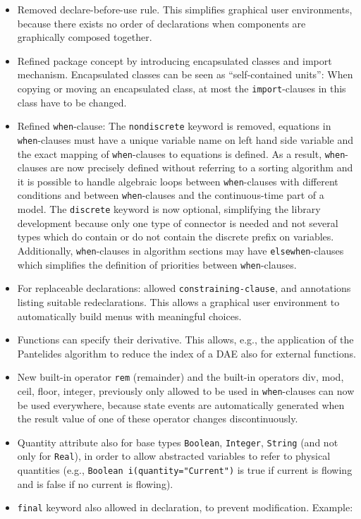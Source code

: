 \begin{itemize}
\item
  Removed declare-before-use rule. This simplifies graphical user
  environments, because there exists no order of declarations when
  components are graphically composed together.
\item
  Refined package concept by introducing encapsulated classes and import mechanism.
  Encapsulated classes can be seen as ``self-contained units'':
  When copying or moving an encapsulated class, at most the \lstinline!import!-clauses in this class have to be changed.
\item
  Refined \lstinline!when!-clause:
  The \lstinline[morekeywords={[2]{nondiscrete}}]!nondiscrete! keyword is removed, equations in \lstinline!when!-clauses must have a unique variable name on left hand side variable and the exact mapping of \lstinline!when!-clauses to equations is defined.
  As a result, \lstinline!when!-clauses are now precisely defined without referring to a sorting algorithm and it is possible to handle algebraic loops between \lstinline!when!-clauses with different conditions and between \lstinline!when!-clauses and the continuous-time part of a model.
  The \lstinline!discrete! keyword is now optional, simplifying the library development because only one type of connector is needed and not several types which do contain or do not contain the discrete prefix on variables.
  Additionally, \lstinline!when!-clauses in algorithm sections may have \lstinline!elsewhen!-clauses which simplifies the definition of priorities between \lstinline!when!-clauses.
\item
  For replaceable declarations: allowed \lstinline[language=grammar]!constraining-clause!, and annotations listing suitable redeclarations.
  This allows a graphical user environment to automatically build menus with meaningful choices.
\item
  Functions can specify their derivative. This allows, e.g., the
  application of the Pantelides algorithm to reduce the index of a DAE
  also for external functions.
\item
  New built-in operator \lstinline!rem! (remainder) and the built-in operators
  div, mod, ceil, floor, integer, previously only allowed to be used in
  \lstinline!when!-clauses can now be used everywhere, because state events are
  automatically generated when the result value of one of these operator
  changes discontinuously.
\item
  Quantity attribute also for base types \lstinline!Boolean!, \lstinline!Integer!, \lstinline!String! (and not only for \lstinline!Real!), in order to allow abstracted variables to refer to physical quantities (e.g., \lstinline!Boolean i(quantity="Current")! is true if current is flowing and is false if no current is flowing).
\item
  \lstinline!final! keyword also allowed in declaration, to prevent modification.
  Example:
\end{itemize}

